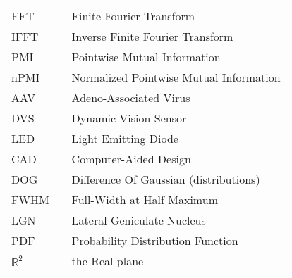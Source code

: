 \begin{center}
\begin{tabular}{lll}
      FFT               & \dotfill      & Finite Fourier Transform  \\
      IFFT               & \dotfill      & Inverse Finite Fourier Transform \\
      PMI               & \dotfill      & Pointwise Mutual Information  \\
      nPMI               & \dotfill      & Normalized Pointwise Mutual Information  \\
      AAV               & \dotfill      & Adeno-Associated Virus  \\
      DVS               & \dotfill      & Dynamic Vision Sensor \\
      LED               & \dotfill      & Light Emitting Diode  \\
        CAD              & \dotfill      & Computer-Aided Design                  \\
        DOG              & \dotfill      & Difference Of Gaussian (distributions) \\
        FWHM             & \dotfill      & Full-Width at Half Maximum             \\
        LGN              & \dotfill      & Lateral Geniculate Nucleus             \\
        PDF              & \dotfill      & Probability Distribution Function      \\
        $\mathbb{R}^{2}$ & \dotfill      & the Real plane                         \\
    \end{tabular}
\end{center}

